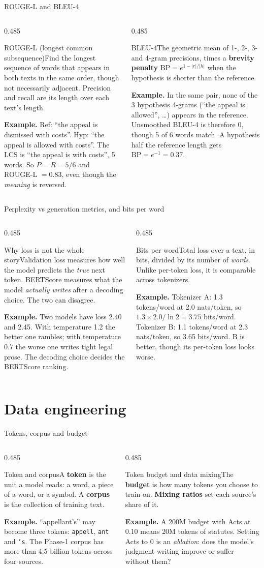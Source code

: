 \documentclass[aspectratio=169,11pt]{beamer}
\newcommand{\code}[1]{\texttt{\small #1}}
\newcommand{\term}[3]{%
  \begin{block}{#1}\small #2\par\vspace{1mm}%
  {\color{exgreen}\textbf{Example.}} #3\end{block}}
\newcommand{\twoterms}[6]{%
  \begin{columns}[T]
    \begin{column}{0.485\textwidth}\term{#1}{#2}{#3}\end{column}
    \begin{column}{0.485\textwidth}\term{#4}{#5}{#6}\end{column}
  \end{columns}}
\begin{document}
\begin{frame}{ROUGE-L and BLEU-4}
  \twoterms{ROUGE-L (longest common subsequence)}
  {Find the longest sequence of words that appears in both texts in the same order, though not necessarily adjacent. Precision and recall are its length over each text's length.}
  {Ref: ``the appeal is dismissed with costs''. Hyp: ``the appeal is allowed with costs''. The LCS is ``the appeal is with costs'', 5 words. So $P=R=5/6$ and ROUGE-L $=0.83$, even though the \emph{meaning} is reversed.}
  {BLEU-4}
  {The geometric mean of 1-, 2-, 3- and 4-gram precisions, times a \textbf{brevity penalty} $\text{BP}=e^{1-|r|/|h|}$ when the hypothesis is shorter than the reference.}
  {In the same pair, none of the 3 hypothesis 4-grams (``the appeal is allowed'', \ldots) appears in the reference. Unsmoothed BLEU-4 is therefore 0, though 5 of 6 words match. A hypothesis half the reference length gets $\text{BP}=e^{-1}=0.37$.}
\end{frame}

\begin{frame}{Perplexity vs generation metrics, and bits per word}
  \twoterms{Why loss is not the whole story}
  {Validation loss measures how well the model predicts the \emph{true} next token. BERTScore measures what the model \emph{actually writes} after a decoding choice. The two can disagree.}
  {Two models have loss 2.40 and 2.45. With temperature 1.2 the better one rambles; with temperature 0.7 the worse one writes tight legal prose. The decoding choice decides the BERTScore ranking.}
  {Bits per word}
  {Total loss over a text, in bits, divided by its number of \emph{words}. Unlike per-token loss, it is comparable across tokenizers.}
  {Tokenizer A: 1.3 tokens/word at 2.0 nats/token, so $1.3\times2.0/\ln2=3.75$ bits/word. Tokenizer B: 1.1 tokens/word at 2.3 nats/token, so 3.65 bits/word. B is better, though its per-token loss looks worse.}
\end{frame}

\section{Data engineering}

\begin{frame}{Tokens, corpus and budget}
  \twoterms{Token and corpus}
  {A \textbf{token} is the unit a model reads: a word, a piece of a word, or a symbol. A \textbf{corpus} is the collection of training text.}
  {``appellant's'' may become three tokens: \code{appell}, \code{ant} and \code{'s}. The Phase-1 corpus has more than 4.5 billion tokens across four sources.}
  {Token budget and data mixing}
  {The \textbf{budget} is how many tokens you choose to train on. \textbf{Mixing ratios} set each source's share of it.}
  {A 200M budget with Acts at 0.10 means 20M tokens of statutes. Setting Acts to 0 is an \emph{ablation}: does the model's judgment writing improve or suffer without them?}
\end{frame}
\end{document}
